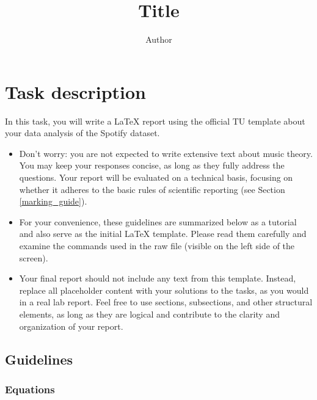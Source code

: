 \documentclass[
	german,
	accentcolor=9c,%
	type=intern,
	marginpar=false
	]{tudapub}
\begin{document}
\title{Title}
\author{Author}

\maketitle

\tableofcontents

\newpage

\section{Task description}
In this task, you will write a LaTeX report using the official TU template about your data analysis of the Spotify dataset. 

\begin{itemize}
\item Don’t worry: you are not expected to write extensive text about music theory. You may keep your responses concise, as long as they fully address the questions. Your report will be evaluated on a technical basis, focusing on whether it adheres to the basic rules of scientific reporting (see Section \ref{marking_guide}). 

\item For your convenience, these guidelines are summarized below as a tutorial and also serve as the initial LaTeX template. Please read them carefully and examine the commands used in the raw file (visible on the left side of the screen).

\item Your final report should not include any text from this template. Instead, replace all placeholder content with your solutions to the tasks, as you would in a real lab report. Feel free to use sections, subsections, and other structural elements, as long as they are logical and contribute to the clarity and organization of your report.
\end{itemize}


\subsection{Guidelines}       %

\subsubsection{Equations}  %
\end{document}
